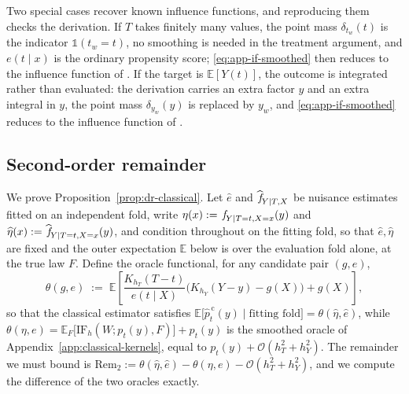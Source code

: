 \documentclass[11pt]{article}
\theoremstyle{plain}
\theoremstyle{definition}
\theoremstyle{remark}
\newcommand{\pE}{\ensuremath{\mathbb{E}}}
\newcommand{\pf}[1]{\ensuremath{\,\mathlarger{\textit{f}}_{#1}}}
\newcommand{\pfhat}[1]{\ensuremath{\,\mathlarger{\widehat{\textit{f}}}_{#1}}}
\newcommand{\Indi}{\ensuremath{\mathds{1}}}
\newcommand{\cO}{\mathcal{O}}
\newcommand{\IF}{\mathrm{IF}}
\newcommand{\gps}{e}
\newcommand{\Rem}{\mathrm{Rem}}
\begin{document}
Two special cases recover known influence functions, and reproducing them checks the
derivation. If $T$ takes finitely many values, the point mass $\delta_{t_w}(t)$ is the
indicator $\Indi(t_w = t)$, no smoothing is needed in the treatment argument, and
$\gps(t \mid x)$ is the ordinary propensity score; \eqref{eq:app-if-smoothed} then reduces to
the influence function of \citet{kennedy2023density}. If the target is $\pE[Y(t)]$, the outcome
is integrated rather than evaluated: the derivation carries an extra factor $y$ and an extra
integral in $y$, the point mass $\delta_{y_w}(y)$ is replaced by $y_w$, and
\eqref{eq:app-if-smoothed} reduces to the influence function of \citet{kennedy2017continuous}.

\subsection{Second-order remainder}
\label{app:classical-remainder}

We prove Proposition~\ref{prop:dr-classical}. Let $\widehat\gps$ and $\pfhat{Y \mid T,X}$ be
nuisance estimates fitted on an independent fold, write $\eta(x) := \pf{Y \mid T=t,X=x}(y)$ and
$\widehat\eta(x) := \pfhat{Y \mid T=t,X=x}(y)$, and condition throughout on the fitting fold, so
that $\widehat\gps,\widehat\eta$ are fixed and the outer expectation $\pE$ below is over the
evaluation fold alone, at the true law $F$. Define the oracle functional, for any candidate pair
$(g,e)$,
\[
\theta(g,e) \;:=\; \pE\!\left[ \frac{K_{h_T}(T-t)}{e(t\mid X)}\big(K_{h_Y}(Y-y)-g(X)\big) + g(X) \right],
\]
so that the classical estimator satisfies $\pE\big[\widehat p^{\,\mathrm c}_t(y)\mid
\text{fitting fold}\big] = \theta(\widehat\eta,\widehat\gps)$, while
$\theta(\eta,\gps) = \pE_F\big[\IF_h(W;p_t(y),F)\big] + p_t(y)$ is the smoothed oracle
of Appendix~\ref{app:classical-kernels}, equal to $p_t(y) + \cO(h_T^2+h_Y^2)$. The remainder we
must bound is $\Rem_2 := \theta(\widehat\eta,\widehat\gps) - \theta(\eta,\gps) - \cO(h_T^2+h_Y^2)$,
and we compute the difference of the two oracles exactly.
\end{document}
